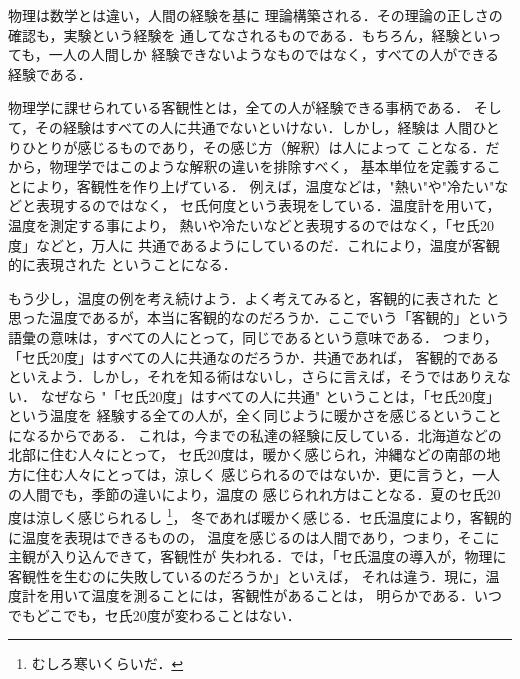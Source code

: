                 物理は数学とは違い，人間の経験を基に
                理論構築される．その理論の正しさの確認も，実験という経験を
                通してなされるものである．もちろん，経験といっても，一人の人間しか
                経験できないようなものではなく，すべての人ができる経験である．

                物理学に課せられている客観性とは，全ての人が経験できる事柄である．
                そして，その経験はすべての人に共通でないといけない．しかし，経験は
                人間ひとりひとりが感じるものであり，その感じ方（解釈）は人によって
                ことなる．だから，物理学ではこのような解釈の違いを排除すべく，
                基本単位を定義することにより，客観性を作り上げている．
                例えば，温度などは，"熱い"や"冷たい"などと表現するのではなく，
                セ氏何度という表現をしている．温度計を用いて，温度を測定する事により，
                熱いや冷たいなどと表現するのではなく，「セ氏20度」などと，万人に
                共通であるようにしているのだ．これにより，温度が客観的に表現された
                ということになる．

                もう少し，温度の例を考え続けよう．よく考えてみると，客観的に表された
                と思った温度であるが，本当に客観的なのだろうか．ここでいう「客観的」という
                語彙の意味は，すべての人にとって，同じであるという意味である．
                つまり，「セ氏20度」はすべての人に共通なのだろうか．共通であれば，
                客観的であるといえよう．しかし，それを知る術はないし，さらに言えば，そうではありえない．
                なぜなら "「セ氏20度」はすべての人に共通" ということは，「セ氏20度」という温度を
                経験する全ての人が，全く同じように暖かさを感じるということになるからである．
                これは，今までの私達の経験に反している．北海道などの北部に住む人々にとって，
                セ氏20度は，暖かく感じられ，沖縄などの南部の地方に住む人々にとっては，涼しく
                感じられるのではないか．更に言うと，一人の人間でも，季節の違いにより，温度の
                感じられれ方はことなる．夏のセ氏20度は涼しく感じられるし
                    \footnote{
                        むしろ寒いくらいだ．
                    }，
                冬であれば暖かく感じる．セ氏温度により，客観的に温度を表現はできるものの，
                温度を感じるのは人間であり，つまり，そこに主観が入り込んできて，客観性が
                失われる．では，「セ氏温度の導入が，物理に客観性を生むのに失敗しているのだろうか」といえば，
                それは違う．現に，温度計を用いて温度を測ることには，客観性があることは，
                明らかである．いつでもどこでも，セ氏20度が変わることはない．

